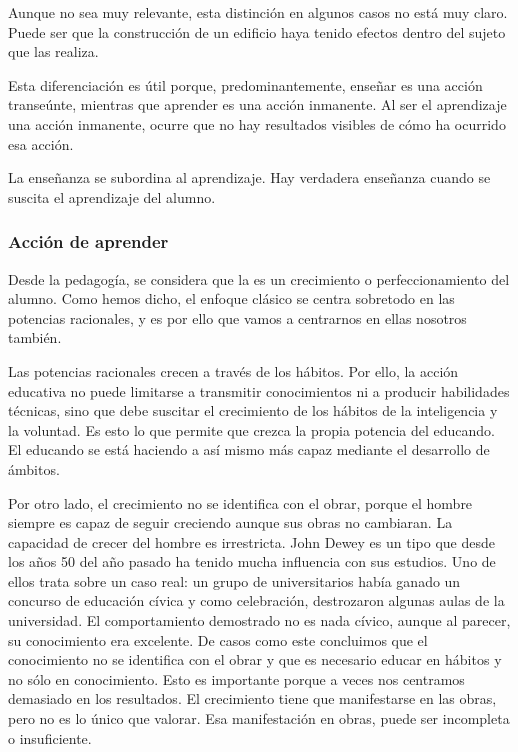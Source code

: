 \documentclass[palatino]{apuntesURJC}
\begin{document}
Aunque no sea muy relevante, esta distinción en algunos casos no está muy claro. 
%
Puede ser que la construcción de un edificio haya tenido efectos dentro del sujeto que las realiza.

Esta diferenciación es útil porque, predominantemente, enseñar es una acción transeúnte, mientras que aprender es una acción inmanente.
%
Al ser el aprendizaje una acción inmanente, ocurre que no hay resultados visibles de cómo ha ocurrido esa acción.

La enseñanza se subordina al aprendizaje.
%
Hay verdadera enseñanza cuando se suscita el aprendizaje del alumno.

\subsubsection{Acción de aprender} 

Desde la pedagogía, se considera que la  es un crecimiento o perfeccionamiento del alumno.
%
Como hemos dicho, el enfoque clásico se centra sobretodo en las potencias racionales, y es por ello que vamos a centrarnos en ellas nosotros también.

Las potencias racionales crecen a través de los hábitos.
%
Por ello, la acción educativa no puede limitarse a transmitir conocimientos ni a producir habilidades técnicas, sino que debe suscitar el crecimiento de los hábitos de la inteligencia y la voluntad.
%
Es esto lo que permite que crezca la propia potencia del educando.
%
El educando se está haciendo a así mismo más capaz mediante el desarrollo de ámbitos.

Por otro lado, el crecimiento no se identifica con el obrar, porque el hombre siempre es capaz de seguir creciendo aunque sus obras no cambiaran. 
%
La capacidad de crecer del hombre es irrestricta.
%
John Dewey es un tipo que desde los años 50 del año pasado ha tenido mucha influencia con sus estudios.
%
Uno de ellos trata sobre un caso real: un grupo de universitarios había ganado un concurso de educación cívica y como celebración, destrozaron algunas aulas de la universidad.
% 
El comportamiento demostrado no es nada cívico, aunque al parecer, su conocimiento era excelente.
%
De casos como este concluimos que el conocimiento no se identifica con el obrar y que es necesario educar en hábitos y no sólo en conocimiento.
%
Esto es importante porque a veces nos centramos demasiado en los resultados.
%
El crecimiento tiene que manifestarse en las obras, pero no es lo único que valorar. Esa manifestación en obras, puede ser incompleta o insuficiente.
\end{document}
